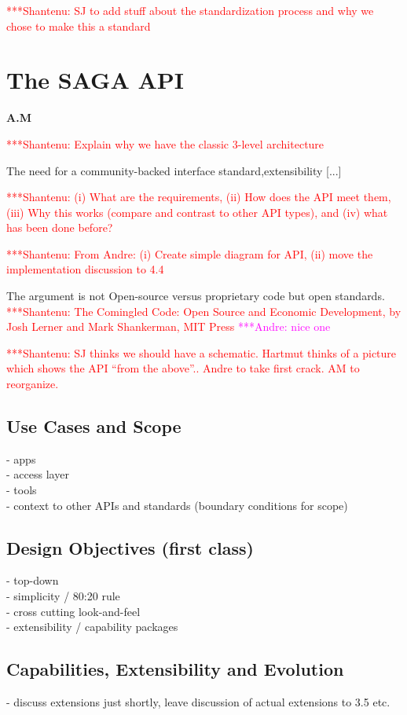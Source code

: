 \documentclass[a4paper,10pt]{article}
\newcommand{\amnote}[1]{   {\textcolor{magenta} { ***Andre:    #1 }}}
\newcommand{\jhanote}[1]{  {\textcolor{red}     { ***Shantenu: #1 }}}
\newcommand{\amnote}[1]{}
\newcommand{\jhanote}[1]{}
\begin{document}
 \jhanote{SJ to add stuff about the standardization process and why we chose 
 to make this a standard}
 

\section{The SAGA API} \textbf{A.M}

 \jhanote{Explain why we have the classic 3-level architecture}

 The need for a community-backed interface standard,extensibility
 [...]

 \jhanote{(i) What are the requirements, (ii) How does the API meet
   them, (iii) Why this works (compare and contrast to other API
   types), and (iv) what has been done before?}

 \jhanote{From Andre: (i) Create simple diagram for API, (ii) move the
   implementation discussion to 4.4}

 The argument is not Open-source versus proprietary code but open
 standards. \jhanote{The Comingled Code: Open Source and Economic
  Development, by Josh Lerner and Mark Shankerman, MIT
  Press}\amnote{nice one}

 \jhanote{SJ thinks we should have a schematic. Hartmut thinks of a
  picture which shows the API ``from the above''.. Andre to take first
  crack. AM to reorganize.}

 \subsection{Use Cases and Scope}
  - apps\\
  - access layer\\
  - tools\\
  - context to other APIs and standards (boundary conditions for scope)


 \subsection{Design Objectives (first class)}
  - top-down\\
  - simplicity / 80:20 rule\\
  - cross cutting look-and-feel\\
  - extensibility / capability packages\\


 \subsection{Capabilities, Extensibility and Evolution}
  - discuss extensions just shortly, leave discussion of actual extensions to
  3.5 etc.\\
  
\end{document}
